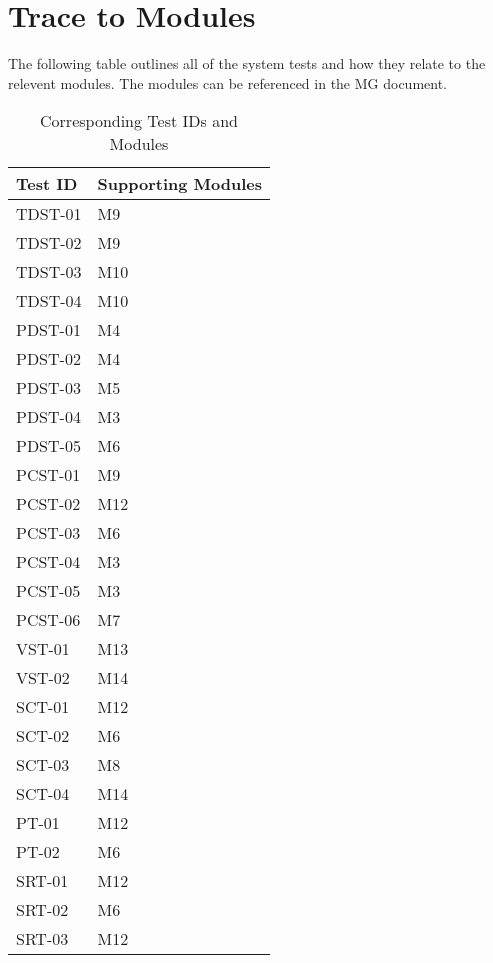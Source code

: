 \documentclass[12pt, titlepage]{article}
\begin{document}
		
\section{Trace to Modules}	

The following table outlines all of the system tests and how they relate to the
relevent modules. The modules can be referenced in the MG document.\\

\begin{longtable}{ |p{4cm}|p{8cm}|  }
  \caption{Corresponding Test IDs and Modules}
  \label{tab:Table1}\\
  
  \hline
  \textbf{Test ID} & \textbf{Supporting Modules}\\
  \hline
  TDST-01 &  M9\\
  \hline
  TDST-02 &  M9 \\
  \hline
  TDST-03 &  M10 \\
  \hline
  TDST-04 &   M10\\
  \hline
  PDST-01 &  M4 \\
  \hline
  PDST-02 &  M4 \\
  \hline
  PDST-03 &  M5 \\
  \hline
  PDST-04 &  M3 \\
  \hline
  PDST-05 & M6 \\
  \hline
  PCST-01 &  M9 \\
  \hline
  PCST-02 & M12 \\
  \hline
  PCST-03 &  M6 \\
  \hline
  PCST-04 &  M3 \\
  \hline
  PCST-05 & M3 \\
  \hline
  PCST-06 &  M7 \\
  \hline
  VST-01 &  M13 \\
  \hline
  VST-02&  M14 \\
  \hline
  SCT-01 &  M12 \\
  \hline
  SCT-02 &  M6 \\
  \hline
  SCT-03 &  M8 \\
  \hline
  SCT-04 &  M14 \\
  \hline
  PT-01 & M12 \\
  \hline
  PT-02 & M6 \\
  \hline
  SRT-01 & M12 \\
  \hline
  SRT-02 & M6 \\
  \hline
  SRT-03 & M12 \\
  \hline
\end{longtable}
\end{document}

